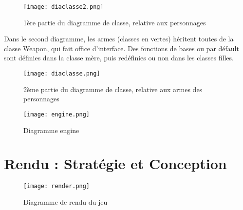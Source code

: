 \documentclass[a4paper,12pt]{report}
\begin{document}
    
    
    
    
    
    
	
    
    
    \begin{landscape}
        \begin{figure}[h!]
    		\centering
    		\texttt{[image: diaclasse2.png]}
    		\caption{1ère partie du diagramme de classe, relative aux personnages}
    	\end{figure}
    \end{landscape}
    	
    	
    Dans le second diagramme, les armes (classes en vertes) héritent toutes de la classe Weapon, qui fait office d'interface. Des fonctions de bases ou par défault sont définies dans la classe mère, puis redéfinies ou non dans les classes filles.
    \begin{landscape}
    	\begin{figure}[h!]
    		\centering
    		\texttt{[image: diaclasse.png]}
    		\caption{2ème partie du diagramme de classe, relative aux armes des personnages}
    	\end{figure}
    \end{landscape}
	
    \begin{landscape}
    	\begin{figure}[h!]
    		\centering
    		\texttt{[image: engine.png]}
    		\caption{Diagramme engine}
    	\end{figure}
    \end{landscape}






	\chapter{Rendu : Stratégie et Conception}
	\begin{landscape}
    	\begin{figure}[h!]
    		\centering
    		\texttt{[image: render.png]}
    		\caption{Diagramme de rendu du jeu}
    	\end{figure}
    \end{landscape}
	
	
	
	






\end{document}
